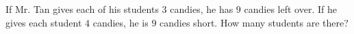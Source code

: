 If Mr. Tan gives each of his students $3$ candies, he has $9$ candies left over. If he gives each student $4$ candies, he is $9$ candies short. How many students are there?
